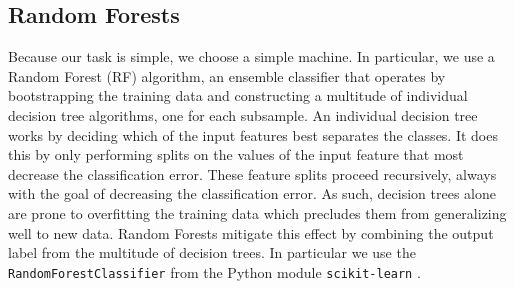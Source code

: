 \documentclass[twocolumn]{aastex6}
\begin{document}
\subsection{Random Forests}
Because our task is simple, we choose a simple machine. In particular, we use 
a Random Forest (RF) algorithm,  an ensemble classifier that operates by bootstrapping
the training data and constructing a multitude of individual decision tree algorithms, 
one for each subsample.  An individual decision tree works by deciding which of 
the input features best separates the classes. It does this by only performing 
splits on the values of the input feature that most decrease the classification 
error. These feature splits proceed recursively, always with the goal of decreasing 
the classification error. As such, decision trees alone are prone to overfitting the 
training data which precludes them from generalizing well to new data. 
Random Forests mitigate this effect by combining the output label from the 
multitude of decision trees.  In particular we use the 
\texttt{RandomForestClassifier} from the Python module \texttt{scikit-learn}
\citep{scikit-learn}. 

\end{document}
